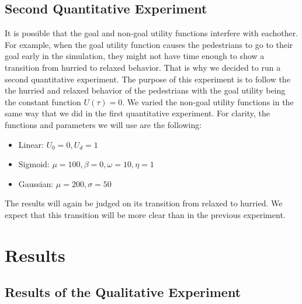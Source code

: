\documentclass[11pt, a4paper]{book}
\begin{document}
\section{Second Quantitative Experiment}
\label{sec:quantitativeexp2}
It is possible that the goal and non-goal utility functions interfere with eachother. For example, when the goal utility function causes the pedestrians to go to their goal early in the simulation, they might not have time enough to show a transition from hurried to relaxed behavior. That is why we decided to run a second quantitative experiment. The purpose of this experiment is to follow the the hurried and relaxed behavior of the pedestrians with the goal utility being the constant function $U(\tau)=0$. We varied the non-goal utility functions in the same way that we did in the first quantitative experiment. For clarity, the functions and parameters we will use are the following:
\begin{itemize}
\item Linear: $U_0=0, U_d=1$
\item Sigmoid: $\mu=100, \beta=0, \omega=10, \eta=1$
\item Gaussian: $\mu=200, \sigma=50$
\end{itemize}

The results will again be judged on its transition from relaxed to hurried. We expect that this transition will be more clear than in the previous experiment.

\chapter{Results}
\label{chap:results}

\section{Results of the Qualitative Experiment}
\label{sec:qualitativeresults}
\end{document}
